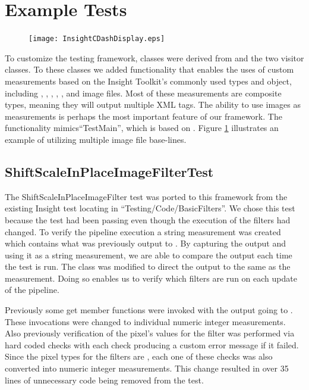 \documentclass{InsightArticle}
\begin{document}
\section{Example Tests}


\begin{figure}
\center
\texttt{[image: InsightCDashDisplay.eps]}
\label{fig:InsightCDashDisplay}
\end{figure}

To customize the testing framework, classes were derived from  and the two visitor classes. To these classes we added functionality that enables the uses of custom measurements based on the Insight Toolkit's commonly used types and object, including , , , , ,  and image files. Most of these measurements are composite types, meaning they will output multiple XML tags. The ability to use images as measurements is perhaps the most important feature of our framework. The functionality mimics``TestMain'', which is based on . Figure \ref{fig:InsightCDashDisplay} illustrates an example of utilizing multiple image file base-lines.



\subsection{ShiftScaleInPlaceImageFilterTest}

The ShiftScaleInPlaceImageFilter test was ported to this framework from the existing Insight test locating in ``Testing/Code/BasicFilters''. We chose this test because the test had been passing even though the execution of the filters had changed. To verify the pipeline execution a string measurement was created which contains what was previously output to . By capturing the output and using it as a string measurement, we are able to compare the output each time the test is run. The  class was modified to direct the output to the same  as the measurement. Doing so enables us to verify which filters are run on each update of the pipeline. 

Previously some get member functions were invoked with the output going to .  These invocations were changed to individual numeric integer measurements. Also previously verification of the pixel's values for the filter was performed via hard coded checks with each check producing a custom error message if it failed. Since the pixel types for the filters are , each one of these checks was also converted into numeric integer measurements. This change resulted in over 35 lines of unnecessary code being removed from the test.
\end{document}
